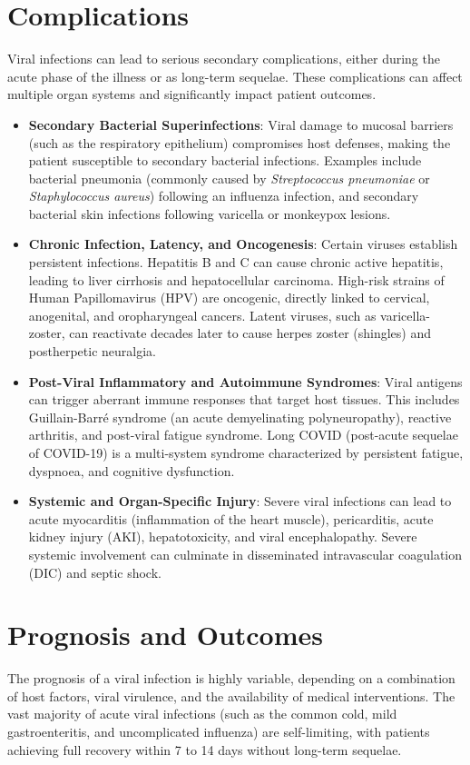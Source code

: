 \section*{Complications}
Viral infections can lead to serious secondary complications, either during the acute phase of the illness or as long-term sequelae. These complications can affect multiple organ systems and significantly impact patient outcomes.
\begin{itemize}
    \item \textbf{Secondary Bacterial Superinfections}: Viral damage to mucosal barriers (such as the respiratory epithelium) compromises host defenses, making the patient susceptible to secondary bacterial infections. Examples include bacterial pneumonia (commonly caused by \textit{Streptococcus pneumoniae} or \textit{Staphylococcus aureus}) following an influenza infection, and secondary bacterial skin infections following varicella or monkeypox lesions.
    \item \textbf{Chronic Infection, Latency, and Oncogenesis}: Certain viruses establish persistent infections. Hepatitis B and C can cause chronic active hepatitis, leading to liver cirrhosis and hepatocellular carcinoma. High-risk strains of Human Papillomavirus (HPV) are oncogenic, directly linked to cervical, anogenital, and oropharyngeal cancers. Latent viruses, such as varicella-zoster, can reactivate decades later to cause herpes zoster (shingles) and postherpetic neuralgia.
    \item \textbf{Post-Viral Inflammatory and Autoimmune Syndromes}: Viral antigens can trigger aberrant immune responses that target host tissues. This includes Guillain-Barr\'{e} syndrome (an acute demyelinating polyneuropathy), reactive arthritis, and post-viral fatigue syndrome. Long COVID (post-acute sequelae of COVID-19) is a multi-system syndrome characterized by persistent fatigue, dyspnoea, and cognitive dysfunction.
    \item \textbf{Systemic and Organ-Specific Injury}: Severe viral infections can lead to acute myocarditis (inflammation of the heart muscle), pericarditis, acute kidney injury (AKI), hepatotoxicity, and viral encephalopathy. Severe systemic involvement can culminate in disseminated intravascular coagulation (DIC) and septic shock.
\end{itemize}

\section*{Prognosis and Outcomes}
The prognosis of a viral infection is highly variable, depending on a combination of host factors, viral virulence, and the availability of medical interventions. The vast majority of acute viral infections (such as the common cold, mild gastroenteritis, and uncomplicated influenza) are self-limiting, with patients achieving full recovery within 7 to 14 days without long-term sequelae.

